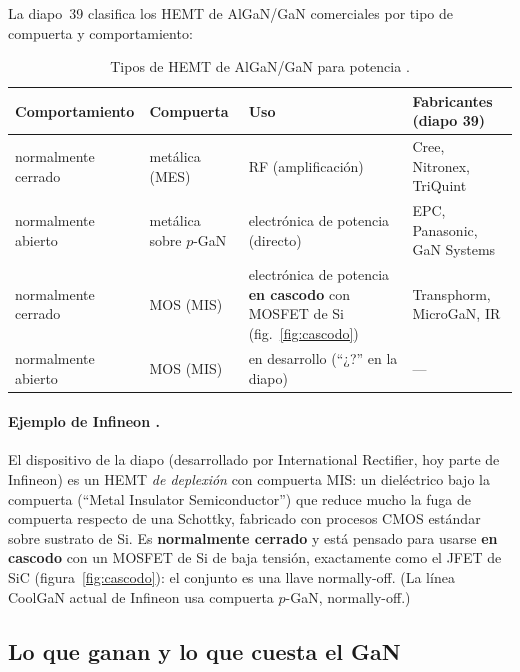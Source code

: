 La diapo~39 clasifica los HEMT de AlGaN/GaN comerciales por tipo de compuerta y comportamiento:

\begin{table}[H]
\centering\small
\begin{tabularx}{\textwidth}{>{\raggedright\arraybackslash}p{3.0cm}>{\raggedright\arraybackslash}p{2.6cm}>{\raggedright\arraybackslash}X>{\raggedright\arraybackslash}p{3.4cm}}
\toprule
Comportamiento & Compuerta & Uso & Fabricantes (diapo 39) \\
\midrule
normalmente cerrado & metálica (MES) & RF (amplificación) & Cree, Nitronex, TriQuint \\
normalmente abierto & metálica sobre $p$-GaN & electrónica de potencia (directo) & EPC, Panasonic, GaN Systems \\
normalmente cerrado & MOS (MIS) & electrónica de potencia \textbf{en cascodo} con MOSFET de Si (fig.~\ref{fig:cascodo}) & Transphorm, MicroGaN, IR \\
normalmente abierto & MOS (MIS) & en desarrollo (``¿?'' en la diapo) & --- \\
\bottomrule
\end{tabularx}
\caption{Tipos de HEMT de AlGaN/GaN para potencia .}
\label{tab:hemt-tipos}
\end{table}

\paragraph{Ejemplo de Infineon .} El dispositivo de la diapo (desarrollado por International
Rectifier, hoy parte de Infineon) es un HEMT \emph{de deplexión} con compuerta MIS: un dieléctrico bajo
la compuerta (``Metal Insulator Semiconductor'') que reduce mucho la fuga de compuerta respecto de una
Schottky, fabricado con procesos CMOS estándar sobre sustrato de Si. Es \textbf{normalmente cerrado} y
está pensado para usarse \textbf{en cascodo} con un MOSFET de Si de baja tensión, exactamente como el
JFET de SiC (figura~\ref{fig:cascodo}): el conjunto es una llave normally-off. (La línea CoolGaN actual
de Infineon usa compuerta $p$-GaN, normally-off.)

\subsection{Lo que ganan y lo que cuesta el GaN}

